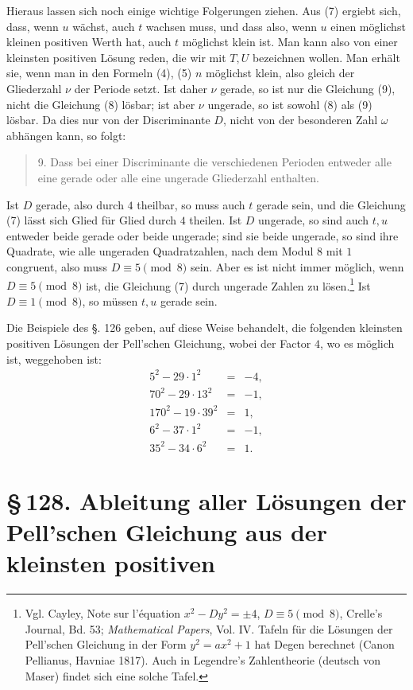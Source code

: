 \documentclass[11pt]{article}
\providecommand{\sect}[2]{\section*{\S\,#1. #2}}
\begin{document}
Hieraus lassen sich noch einige wichtige Folgerungen ziehen. Aus (7) ergiebt sich, dass, wenn $u$ wächst, auch $t$ wachsen muss, und dass also, wenn $u$ einen möglichst kleinen positiven Werth hat, auch $t$ möglichst klein ist. Man kann also von einer kleinsten positiven Lösung reden, die wir mit $T,U$ bezeichnen wollen. Man erhält sie, wenn man in den Formeln (4), (5) $n$ möglichst klein, also gleich der Gliederzahl $\nu$ der Periode setzt. Ist daher $\nu$ gerade, so ist nur die Gleichung (9), nicht die Gleichung (8) lösbar; ist aber $\nu$ ungerade, so ist sowohl (8) als (9) lösbar. Da dies nur von der Discriminante $D$, nicht von der besonderen Zahl $\omega$ abhängen kann, so folgt:
\begin{quote}
9. Dass bei einer Discriminante die verschiedenen Perioden entweder alle eine gerade oder alle eine ungerade Gliederzahl enthalten.
\end{quote}

Ist $D$ gerade, also durch $4$ theilbar, so muss auch $t$ gerade sein, und die Gleichung (7) lässt sich Glied für Glied durch $4$ theilen. Ist $D$ ungerade, so sind auch $t,u$ entweder beide gerade oder beide ungerade; sind sie beide ungerade, so sind ihre Quadrate, wie alle ungeraden Quadratzahlen, nach dem Modul $8$ mit $1$ congruent, also muss $D\equiv5\pmod 8$ sein. Aber es ist nicht immer möglich, wenn $D\equiv5\pmod8$ ist, die Gleichung (7) durch ungerade Zahlen zu lösen.\footnote{Vgl. Cayley, Note sur l'équation $x^2-Dy^2=\pm4$, $D\equiv5\pmod8$, Crelle's Journal, Bd. 53; \emph{Mathematical Papers}, Vol. IV. Tafeln für die Lösungen der Pell'schen Gleichung in der Form $y^2=ax^2+1$ hat Degen berechnet (Canon Pellianus, Havniae 1817). Auch in Legendre's Zahlentheorie (deutsch von Maser) findet sich eine solche Tafel.} Ist $D\equiv1\pmod8$, so müssen $t,u$ gerade sein.

Die Beispiele des §. 126 geben, auf diese Weise behandelt, die folgenden kleinsten positiven Lösungen der Pell'schen Gleichung, wobei der Factor $4$, wo es möglich ist, weggehoben ist:
\[
\begin{array}{rcl}
5^2-29\cdot1^2&=&-4,\\
70^2-29\cdot13^2&=&-1,\\
170^2-19\cdot39^2&=&1,\\
6^2-37\cdot1^2&=&-1,\\
35^2-34\cdot6^2&=&1.
\end{array}
\]

\sect{128}{Ableitung aller Lösungen der Pell'schen Gleichung aus der kleinsten positiven}
\end{document}

